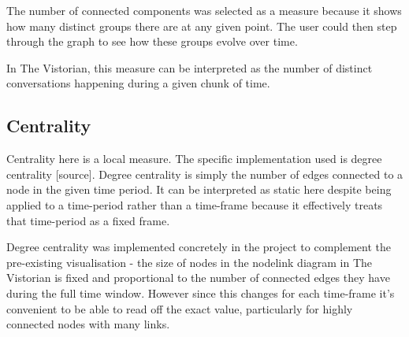 The number of connected components was selected as a measure because it shows how many distinct groups there are at any given point. The user could then step through the graph to see how these groups evolve over time.

In The Vistorian, this measure can be interpreted as the number of distinct conversations happening during a given chunk of time. 


\subsection{Centrality}
Centrality here is a local measure. The specific implementation used is degree centrality [source]. Degree centrality is simply the number of edges connected to a node in the given time period. It can be interpreted as static here despite being applied to a time-period rather than a time-frame because it effectively treats that time-period as a fixed frame.

Degree centrality was implemented concretely in the project to complement the pre-existing visualisation - the size of nodes in the nodelink diagram in The Vistorian is fixed and proportional to the number of connected edges they have during the full time window. However since this changes for each time-frame it's convenient to be able to read off the exact value, particularly for highly connected nodes with many links.

